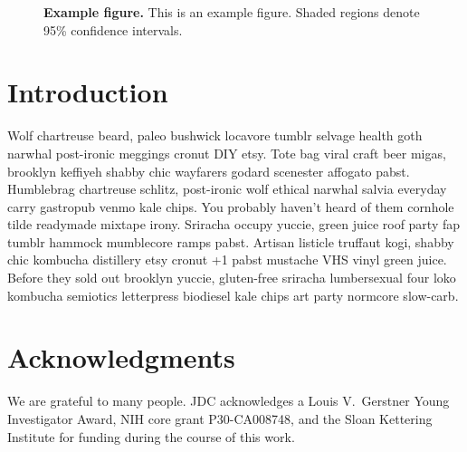 \documentclass[aps,pre,twocolumn,nofootinbib,superscriptaddress,linenumbers,11point]{revtex4-1}
\begin{document}
\begin{figure}[tbp]
\caption{\label{figure:example} {\bf Example figure.} 
This is an example figure.
Shaded regions denote 95\% confidence intervals.
}
\end{figure}


\section*{Introduction}
\label{section:introduction}

Wolf chartreuse beard, paleo bushwick locavore tumblr selvage health goth narwhal post-ironic meggings cronut DIY etsy. 
Tote bag viral craft beer migas, brooklyn keffiyeh shabby chic wayfarers godard scenester affogato pabst. 
Humblebrag chartreuse schlitz, post-ironic wolf ethical narwhal salvia everyday carry gastropub venmo kale chips. You probably haven't heard of them cornhole tilde readymade mixtape irony. 
Sriracha occupy yuccie, green juice roof party fap tumblr hammock mumblecore ramps pabst. Artisan listicle truffaut kogi, shabby chic kombucha distillery etsy cronut +1 pabst mustache VHS vinyl green juice. 
Before they sold out brooklyn yuccie, gluten-free sriracha lumbersexual four loko kombucha semiotics letterpress biodiesel kale chips art party normcore slow-carb.


\section*{Acknowledgments}

We are grateful to many people.
JDC acknowledges a Louis V.~Gerstner Young Investigator Award, NIH core grant P30-CA008748, and the Sloan Kettering Institute for funding during the course of this work.


 

\end{document}
